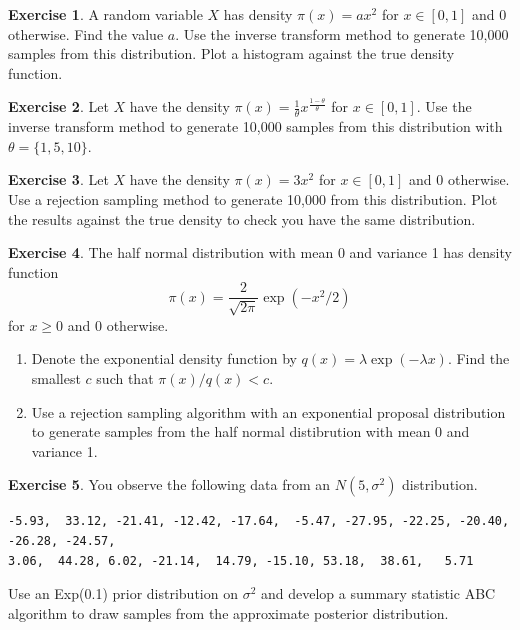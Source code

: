 \documentclass[
]{book}
\providecommand{\tightlist}{%
  \setlength{\itemsep}{0pt}\setlength{\parskip}{0pt}}
\theoremstyle{definition}
\theoremstyle{definition}
\theoremstyle{definition}
\newtheorem{exercise}{Exercise}[chapter]
\theoremstyle{definition}
\theoremstyle{remark}
\begin{document}
\begin{exercise}
A random variable \(X\) has density \(\pi(x) = ax^2\) for \(x\in[0,1]\) and 0 otherwise. Find the value \(a\). Use the inverse transform method to generate 10,000 samples from this distribution. Plot a histogram against the true density function.
\end{exercise}

\begin{exercise}
Let \(X\) have the density \(\pi(x) = \frac{1}{\theta}x^{\frac{1-\theta}{\theta}}\) for \(x \in [0, 1]\). Use the inverse transform method to generate 10,000 samples from this distribution with \(\theta = \{1, 5, 10\}\).
\end{exercise}

\begin{exercise}
Let \(X\) have the density \(\pi(x) = 3x^2\) for \(x \in [0, 1]\) and 0 otherwise. Use a rejection sampling method to generate 10,000 from this distribution. Plot the results against the true density to check you have the same distribution.
\end{exercise}

\begin{exercise}

The half normal distribution with mean 0 and variance 1 has density function
\[
\pi(x) = \frac{2}{\sqrt{2\pi}}\exp{(-x^2/2)}
\]
for \(x \geq 0\) and 0 otherwise.

\begin{enumerate}
\def\labelenumi{\arabic{enumi}.}
\tightlist
\item
  Denote the exponential density function by \(q(x) = \lambda \exp(-\lambda x)\). Find the smallest \(c\) such that \(\pi(x)/q(x) < c\).
\item
  Use a rejection sampling algorithm with an exponential proposal distribution to generate samples from the half normal distibrution with mean 0 and variance 1.
\end{enumerate}

\end{exercise}

\begin{exercise}
You observe the following data from an \(N(5, \sigma^2)\) distribution.

\begin{verbatim}
-5.93,  33.12, -21.41, -12.42, -17.64,  -5.47, -27.95, -22.25, -20.40, -26.28, -24.57,  
3.06,  44.28, 6.02, -21.14,  14.79, -15.10, 53.18,  38.61,   5.71
\end{verbatim}

Use an Exp(0.1) prior distribution on \(\sigma^2\) and develop a summary statistic ABC algorithm to draw samples from the approximate posterior distribution.
\end{exercise}
\end{document}
